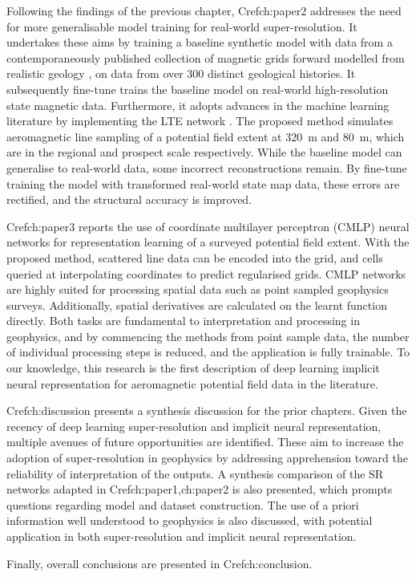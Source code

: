 \documentclass[manuscript.tex]{subfiles}
\begin{document}
Following the findings of the previous chapter, Cref{ch:paper2} addresses the need for more generalisable model training for real-world super-resolution.
It undertakes these aims by training a baseline synthetic model with data from a contemporaneously published collection of magnetic grids forward modelled from realistic geology \parencite{jessellNoddyverseMassiveData2022}, on data from over \num{300} distinct geological histories.
It subsequently fine-tune trains the baseline model on real-world high-resolution state magnetic data.
Furthermore, it adopts advances in the machine learning literature by implementing the LTE network \parencite{leeLocalTextureEstimator2022}.
The proposed method simulates aeromagnetic line sampling of a potential field extent at \qty{320}{\m} and \qty{80}{\m}, which are in the regional and prospect scale respectively.
While the baseline model can generalise to real-world data, some incorrect reconstructions remain.
By fine-tune training the model with transformed real-world state map data, these errors are rectified, and the structural accuracy is improved.

Cref{ch:paper3} reports the use of coordinate multilayer perceptron (CMLP) neural networks for representation learning of a surveyed potential field extent.
With the proposed method, scattered line data can be encoded into the grid, and cells queried at interpolating coordinates to predict regularised grids.
CMLP networks are highly suited for processing spatial data such as point sampled geophysics surveys.
Additionally, spatial derivatives are calculated on the learnt function directly.
Both tasks are fundamental to interpretation and processing in geophysics, and by commencing the methods from point sample data, the number of individual processing steps is reduced, and the application is fully trainable.
To our knowledge, this research is the first description of deep learning implicit neural representation for aeromagnetic potential field data in the literature.

Cref{ch:discussion} presents a synthesis discussion for the prior chapters. Given the recency of deep learning super-resolution and implicit neural representation, multiple avenues of future opportunities are identified.
These aim to increase the adoption of super-resolution in geophysics by addressing apprehension toward the reliability of interpretation of the outputs.
A synthesis comparison of the SR networks adapted in Cref{ch:paper1,ch:paper2} is also presented, which prompts questions regarding model and dataset construction.
The use of a priori information well understood to geophysics is also discussed, with potential application in both super-resolution and implicit neural representation.

Finally, overall conclusions are presented in Cref{ch:conclusion}.

\printbibliography{}
\end{document}
